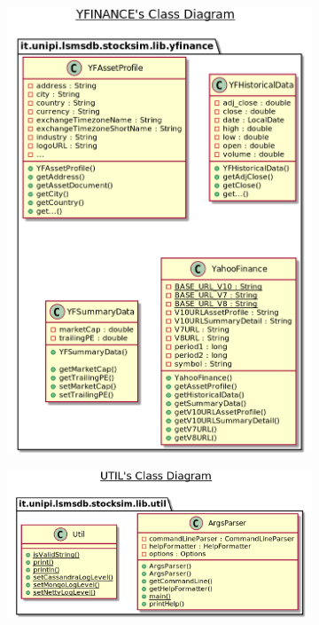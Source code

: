 \begin{figure}[H]
\begin{subfigure}{.3\textwidth}
  \hspace{-3.0cm}
  \includegraphics[scale=0.16]{plantuml/library/yfinance.png}
\end{subfigure}%
\hspace{-1.0cm}
\begin{subfigure}{.3\textwidth}
  \includegraphics[scale=0.2]{plantuml/library/util.png}

\end{subfigure}
\end{figure}
